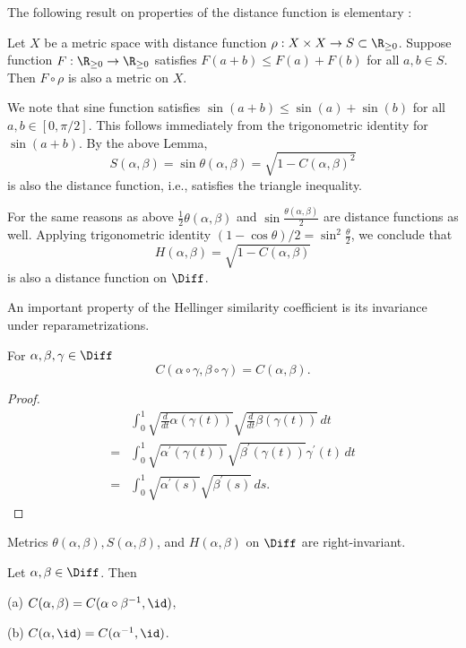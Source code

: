 \documentclass[12pt]{amsart}
\begin{document}
The following result on properties of the distance function is elementary \cite{Co}:

\begin{lemma}
\label{distance}
Let $X$ be a metric space with distance function $\rho: X \times X \rightarrow S \subset \R_{\geq 0}$. Suppose function $F: \R_{\geq 0} \rightarrow \R_{\geq 0}$
satisfies $F(a+b) \leq F(a) + F(b)$ for all $a, b \in S$. Then $F \circ \rho$ is also a metric on $X$.
\end{lemma}

We note that sine function satisfies $\sin(a+b) \leq \sin(a) + \sin(b)$ for all $a, b \in [0, \pi/2]$. This follows immediately from the trigonometric identity for $\sin(a+b)$. By the above Lemma, 
\[S(\alpha, \beta) = \sin \theta(\alpha, \beta) = \sqrt{ 1 - C(\alpha, \beta)^2}\]
is also the distance function, i.e., satisfies the triangle inequality.

For the same reasons as above $\frac{1}{2} \theta(\alpha, \beta)$ and $\sin \frac{\theta(\alpha, \beta)}{2}$ are distance functions as well.
Applying trigonometric identity $(1 - \cos \theta)/2 = \sin^2 \frac{\theta}{2}$, we conclude that
\[H(\alpha, \beta) = \sqrt{ 1 - C(\alpha, \beta)}\]
is also a distance function on $\Diff$. 

An important property of the Hellinger similarity coefficient is its invariance under reparametrizations.

\begin{proposition}
\label{invariance}
For $\alpha, \beta, \gamma \in \Diff$
\[C(\alpha \circ \gamma, \beta \circ \gamma) = C(\alpha, \beta).\]
\end{proposition}
\begin{proof}
\begin{align*}
&\int_0^1 \sqrt{\frac{d}{dt} \alpha(\gamma(t))} \sqrt{\frac{d}{dt} \beta(\gamma(t))} \, dt \\
= &\int_0^1 \sqrt{\alpha^\prime(\gamma(t))} \sqrt{\beta^\prime(\gamma(t))} \gamma^\prime(t) \, dt \\
= &\int_0^1 \sqrt{\alpha^\prime(s)} \sqrt{\beta^\prime(s)} \, ds .
\end{align*}
\end{proof}

\begin{corollary}
Metrics $\theta(\alpha, \beta), S(\alpha, \beta)$, and $H(\alpha, \beta)$ on $\Diff$ are right-invariant. 
\end{corollary}

\begin{corollary}
\label{hop}
Let $\alpha, \beta \in \Diff$. Then

(a) $C(\alpha, \beta) = C(\alpha \circ \beta^{-1}, \id)$,

(b) $C(\alpha, \id) = C(\alpha^{-1}, \id)$.
\end{corollary}
\end{document}
